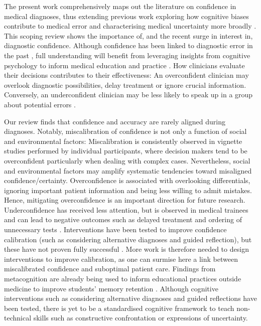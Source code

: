 \documentclass[a4paper, nobind]{templates/ociamthesis}
\begin{document}
The present work comprehensively maps out the literature on confidence in medical diagnoses, thus extending previous work exploring how cognitive biases contribute to medical error \autocite{kostopoulou_diagnostic_2008,graber_cognitive_2012,saposnik_cognitive_2016} and characterising medical uncertainty more broadly \autocite{hall_reviewing_2002,bhise_defining_2018}. This scoping review shows the importance of, and the recent surge in interest in, diagnostic confidence. Although confidence has been linked to diagnostic error in the past \autocite{berner_overconfidence_2008}, full understanding will benefit from leveraging insights from cognitive psychology to inform medical education and practice \autocite{wears_diagnosing_2014}. How clinicians evaluate their decisions contributes to their effectiveness: An overconfident clinician may overlook diagnostic possibilities, delay treatment or ignore crucial information. Conversely, an underconfident clinician may be less likely to speak up in a group about potential errors \autocite{hemon_speaking_2020}.

\hfill\break
Our review finds that confidence and accuracy are rarely aligned during diagnoses. Notably, miscalibration of confidence is not only a function of social and environmental factors: Miscalibration is consistently observed in vignette studies performed by individual participants, where decision makers tend to be overconfident particularly when dealing with complex cases. Nevertheless, social and environmental factors may amplify systematic tendencies toward misaligned confidence/certainty. Overconfidence is associated with overlooking differentials, ignoring important patient information and being less willing to admit mistakes. Hence, mitigating overconfidence is an important direction for future research. Underconfidence has received less attention, but is observed in medical trainees \autocite{mann_relationship_1993,yang_effect_2012,brezis_does_2019} and can lead to negative outcomes such as delayed treatment \autocite{thompson_nurses_2004} and ordering of unnecessary tests \autocite{gupta_associations_2023}. Interventions have been tested to improve confidence calibration (such as considering alternative diagnoses and guided reflection), but these have not proven fully successful \autocite{lambe_guided_2018,costa_filho_effects_2019}. More work is therefore needed to design interventions to improve calibration, as one can surmise here a link between miscalibrated confidence and suboptimal patient care. Findings from metacognition are already being used to inform educational practices outside medicine to improve students' memory retention \autocite{dunlosky_strengthening_2013,putnam_optimizing_2016}. Although cognitive interventions such as considering alternative diagnoses and guided reflections have been tested, there is yet to be a standardised cognitive framework to teach non-technical skills such as constructive confrontation or expressions of uncertainty.
\end{document}
